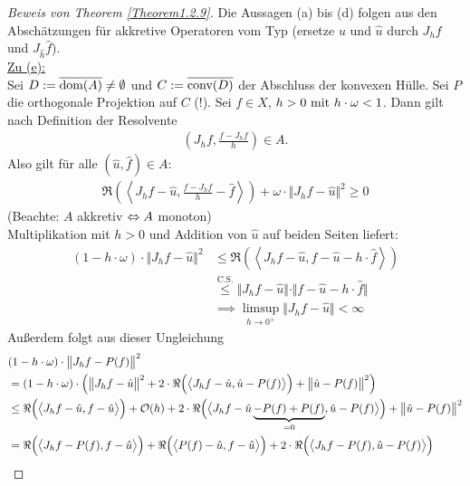 \begin{proof}[Beweis von Theorem \ref{Theorem1.2.9}]\enter
Die Aussagen (a) bis (d) folgen aus den Abschätzungen für akkretive Operatoren vom Typ (ersetze $u$ und $\hat{u}$ durch $J_hf$ und $J_{\hat{h}}\hat{f}$).\\

\underline{Zu (e):}\\
Sei $D:=\overline{\dom(A)}\neq\emptyset$  und $C:=\overline{\conv(D)}$ der Abschluss der konvexen Hülle. Sei $P$ die orthogonale Projektion  auf $C$ (!). Sei $f\in X$, $h>0\mit h\cdot\omega<1$. Dann gilt nach Definition der Resolvente
\begin{align*}
\left( J_h f,\frac{f-J_h f}{h}\right)\in A.
\end{align*}
Also gilt für alle $(\hat{u},\hat{f})\in A$:
\begin{align*}
\Re\left(\left\langle J_h f-\hat{u},\frac{f-J_h f}{h}-\hat{f}\right\rangle\right)+\omega\cdot\big\Vert J_h f-\hat{u}\big\Vert^2\geq0
\end{align*}
(Beachte: $A$ akkretiv $\gdw A$ monoton)\\
Multiplikation mit $h>0$ und Addition von $\hat{u}$ auf beiden Seiten  liefert:
\begin{align*}
(1-h\cdot\omega)\cdot\big\Vert J_h f-\hat{u}\big\Vert^2
&\leq
\Re\left(\left\langle J_h f-\hat{u},f-\hat{u}-h\cdot \hat{f}\right\rangle\right)\\
&\stackrel{\text{C.S.}}{\leq}
\big\Vert J_h f-\hat{u}\big\Vert\cdot\Vert f-\hat{u}-h\cdot\hat{f}\big\Vert\\
&\implies
\limsup\limits_{h\to 0^+}\big\Vert J_h f-\hat{u}\big\Vert<\infty
\end{align*}
Außerdem folgt aus dieser Ungleichung
\begin{align*}
&(1-h\cdot\omega)\cdot\big\Vert J_h f- P(f)\big\Vert^2\\
&=(1-h\cdot\omega)\cdot\left(\big\Vert J_h f-\hat{u}\big\Vert^2+2\cdot\Re\Big(\big\langle J_h f-\hat{u},\hat{u}-P(f)\big\rangle\Big)+\big\Vert\hat{u}-P(f)\big\Vert^2\right)\\
&\leq
\Re\Big(\big\langle J_h f-\hat{u},f-\hat{u}\big\rangle\Big)+\O(h)
+2\cdot\Re\Big(\big\langle J_h f-\hat{u}\underbrace{-P(f)+P(f)}_{=0},\hat{u}-P(f)\big\rangle\Big)
+\big\Vert\hat{u}-P(f)\big\Vert^2\\
&=
\Re\Big(\big\langle J_h f-P(f),f-\hat{u}\big\rangle\Big)
+\Re\Big(\big\langle P(f)-\hat{u},f-\hat{u}\big\rangle\Big)
+2\cdot\Re\Big(\big\langle J_h f-P(f),\hat{u}-P(f)\big\rangle\Big)\\

\end{align*}
\end{proof}
